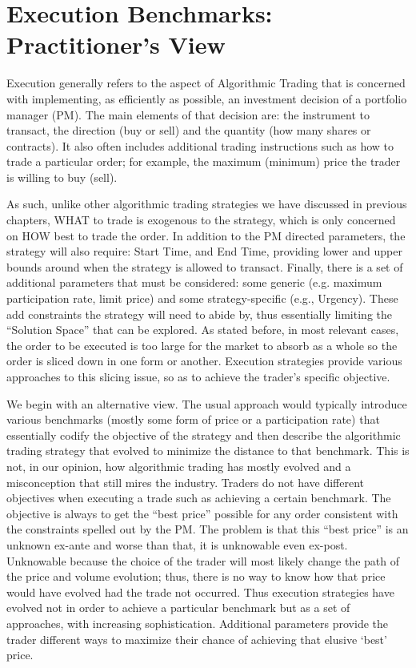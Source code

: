 \section{Execution Benchmarks: Practitioner's View\label{sec:exec_bench_prac_view}}

Execution generally refers to the aspect of Algorithmic Trading that is concerned with  implementing, as efficiently as possible, an investment decision of a portfolio manager (PM). The main elements of that decision are: the instrument to transact, the direction (buy or sell) and the quantity (how many shares or contracts). It also often includes additional trading instructions such as how to trade a particular order; for example, the maximum (minimum) price the trader is willing to buy (sell). 


As such, unlike other algorithmic trading strategies we have discussed in previous chapters, WHAT to trade is exogenous to the strategy, which is only concerned on HOW best to trade the order. In addition to the PM directed parameters, the strategy will also require: Start Time, and End Time, providing lower and upper bounds around when the strategy is allowed to transact. Finally, there is a set of additional parameters that must be considered: some generic (e.g. maximum participation rate, limit price) and some strategy-specific (e.g., Urgency). These add constraints the strategy will need to abide by, thus essentially limiting the ``Solution Space'' that can be explored. As stated before, in most relevant cases, the order to be executed is too large for the market to absorb as a whole so the order is sliced down in one form or another. Execution strategies provide various approaches to this slicing issue, so as to achieve the trader's specific objective.


We begin with an alternative view. The usual approach would typically introduce various benchmarks (mostly some form of price or a participation rate) that essentially codify the objective of the strategy and then describe the algorithmic trading strategy that evolved to minimize the distance to that benchmark. This is not, in our opinion, how algorithmic trading has mostly evolved and a misconception that still mires the industry. Traders do not have different objectives when executing a trade such as achieving a certain benchmark. The objective is always to get the ``best price'' possible for any order consistent with the constraints spelled out by the PM. The problem is that this ``best price''  is an unknown ex-ante and worse than that, it is unknowable even ex-post. Unknowable because the choice of the trader will most likely change the path of the price and volume evolution; thus, there is no way to know how that price would have evolved had the trade not occurred. Thus execution strategies have evolved not in order to achieve a particular benchmark but as a set of approaches, with increasing sophistication. Additional parameters provide the trader different ways to maximize their chance of achieving that elusive `best' price. \twomedskip


